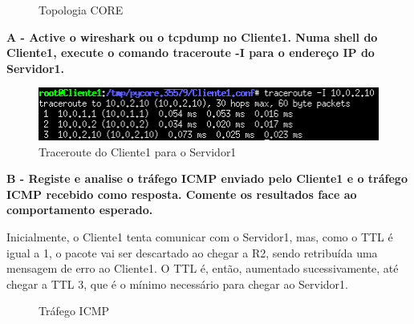 \documentclass[11pt]{article}
\begin{document}
\begin{figure}[hbt!]
    \centering
    \caption{Topologia CORE}
\end{figure}

\vspace{0.5cm}

\textbf{A - Active o wireshark ou o tcpdump no Cliente1. Numa shell do
Cliente1, execute o comando traceroute -I para o endereço
IP do Servidor1.}

\begin{figure}[hbt!]
    \centering
    \includegraphics[width=1\textwidth]{images/parte1/topologia/t_route.png}
    \caption{Traceroute do Cliente1 para o Servidor1}
\end{figure}

\clearpage

\textbf{B - Registe e analise o tráfego ICMP enviado pelo Cliente1 e o tráfego ICMP recebido como resposta. Comente os resultados face ao comportamento esperado.}

Inicialmente, o Cliente1 tenta comunicar com o Servidor1, mas, como o TTL é igual a 1, o pacote vai ser descartado ao chegar a R2, sendo retribuída uma mensagem de erro ao Cliente1. O TTL é, então, aumentado sucessivamente, até chegar a TTL 3, que é o mínimo necessário para chegar ao Servidor1.

\begin{figure}[hbt!]
    \centering
    \caption{Tráfego ICMP}
\end{figure}
\end{document}
